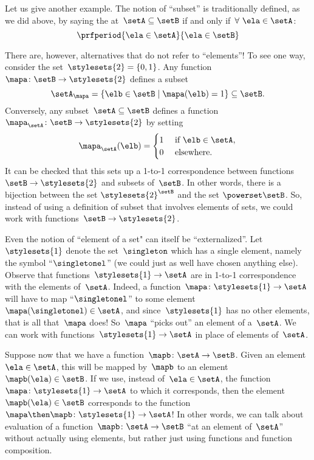 Let us give another example.
The notion of ``subset'' is traditionally defined, as we did above, by saying the at~$\setA \subseteq \setB$ if and only if~$\forall \ \ela \in \setA$:
\begin{equation*}
    \prfperiod{
        \ela \in \setA
    }{
        \ela \in \setB
    }
\end{equation*}

There are, however, alternatives that do not refer to ``elements''!
To see one way, consider the set~$\stylesets{2} = \{ 0, 1\}$.
Any function~$\mapa \colon \setB \to \stylesets{2}$ defines a subset
\begin{equation*}
    \setA_\mapa = \{ \elb \in \setB \mid \mapa(\elb) = 1 \} \subseteq \setB.
\end{equation*}
Conversely, any subset~$\setA \subseteq \setB$ defines a function~$\mapa_\setA \colon \setB \to \stylesets{2}$ by setting
\begin{equation*}
    \mapa_\setA(\elb) = \begin{cases}
        1 & \text{ if }\elb\in \setA, \\
        0 & \text{ elsewhere}.
    \end{cases}
\end{equation*}
It can be checked that this sets up a 1-to-1 correspondence between functions~$\setB \to \stylesets{2}$ and subsets of~$\setB$.
In other words, there is a bijection between the set $\stylesets{2}^\setB$ and the set $\powerset \setB$.
So, instead of using a definition of subset that involves elements of sets, we could work with functions~$\setB \to \stylesets{2}$.

Even the notion of ``element of a set" can itself be ``externalized''.
Let~$\stylesets{1}$ denote the set~$\singleton$ which has a single element, namely the symbol ``$\singletonel$'' (we could just as well have chosen anything else).
Observe that functions~$\stylesets{1} \to \setA$ are in 1-to-1 correspondence with the elements of~$\setA$.
Indeed, a function~$\mapa\colon \stylesets{1} \to \setA$ will have to map ``$\singletonel$'' to some element~$\mapa(\singletonel) \in \setA$, and since~$\stylesets{1}$ has no other elements, that is all that~$\mapa$ does!
So~$\mapa$ ``picks out'' an element of a~$\setA$.
We can work with functions~$\stylesets{1} \to \setA$ in place of elements of~$\setA$.

Suppose now that we have a function~$\mapb \colon \setA \to \setB$.
Given an element~$\ela \in \setA$, this will be mapped by~$\mapb$ to an element~$\mapb(\ela) \in \setB$.
If we use, instead of~$\ela \in \setA$, the function~$\mapa \colon \stylesets{1} \to \setA$ to which it corresponds, then the element~$\mapb(\ela) \in \setB$ corresponds to the function~$\mapa \then \mapb\colon \stylesets{1} \to \setA$!
In other words, we can talk about evaluation of a function~$\mapb \colon \setA \to \setB$ ``at an element of~$\setA$'' without actually using elements, but rather just using functions and function composition.




